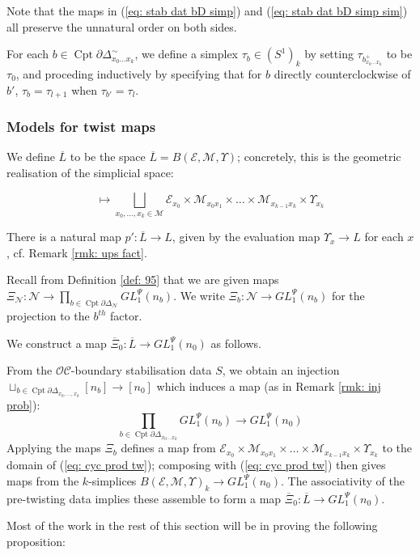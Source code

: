 \documentclass{TPmod}
\newcommand{\Cptd}{\operatorname{Cpt}\partial}
\newcommand{\cC}{\mathcal{C}}
\newcommand{\cE}{\mathcal{E}}
\newcommand{\cM}{\mathcal{M}}
\newcommand{\cN}{\mathcal{N}}
\newcommand{\cO}{\mathcal{O}}
\numberwithin{equation}{section}
\begin{document}
    Note that the maps in (\ref{eq: stab dat bD simp}) and (\ref{eq: stab dat bD simp sim}) all preserve the unnatural order on both sides.

    For each $b \in \Cptd\Delta^\sim_{x_0 \ldots x_k}$, we define a simplex $\tau_b \in (S^1)_k$ by setting $\tau_{b^+_{x_0 \ldots x_k}}$ to be $\tau_0$, and proceding inductively by specifying that for $b$ directly counterclockwise of $b'$, $\tau_b=\tau_{l+1}$ when $\tau_{b'} = \tau_l$.


\subsubsection{Models for twist maps}\label{sec: mode twis}

    We define $\overline L$ to be the space $\overline L = B(\cE,\cM,\Upsilon)$; concretely, this is the geometric realisation of the simplicial space:


    \begin{equation}
        [k] \mapsto \bigsqcup\limits_{x_0, \ldots, x_k \in \cM} \cE_{x_0} \times \cM_{x_0 x_1} \times \ldots \times \cM_{x_{k-1} x_k} \times \Upsilon_{x_k}
    \end{equation}

    There is a natural map $p': \overline L \to L$, given by the evaluation map $\Upsilon_x \to L$ for each $x$, cf. Remark \ref{rmk: ups fact}.

    Recall from Definition \ref{def: 95} that we are given maps $\Xi_\cN: \cN \to \prod_{b \in \Cptd\Delta_\cN} GL_1^\Psi(n_b)$. We write $\Xi_b: \cN \to GL_1^\Psi(n_b)$ for the projection to the $b^{th}$ factor.
    \begin{defn}
        We construct a map $\overline \Xi_0: \overline L \to GL_1^\Psi(n_0)$ as follows. 
    
        From the $\cO\cC$-boundary stabilisation data $S$, we obtain an injection $\sqcup_{b \in \Cptd\Delta_{x_0, \ldots, x_k}} [n_b] \to [n_0]$
        which induces a map (as in Remark \ref{rmk: inj prob}):
        \begin{equation}\label{eq: cyc prod tw}
            \prod\limits_{b \in \Cptd\Delta_{x_0 \ldots x_k}} GL_1^\Psi(n_b) \to GL_1^\Psi(n_0)
        \end{equation}
        Applying the maps $\Xi_b$ defines a map from $\cE_{x_0} \times \cM_{x_0x_1} \times \ldots \times \cM_{x_{k-1} x_k} \times \Upsilon_{x_k}$ to the domain of (\ref{eq: cyc prod tw}); composing with (\ref{eq: cyc prod tw}) then gives maps from the $k$-simplices $B(\cE,\cM,\Upsilon)_k \to GL_1^\Psi(n_0)$. The associativity of the pre-twisting data implies these assemble to form a map $\overline \Xi_0: \overline L \to GL_1^\Psi(n_0)$.
    \end{defn}
    Most of the work in the rest of this section will be in proving the following proposition:
    
\end{document}

